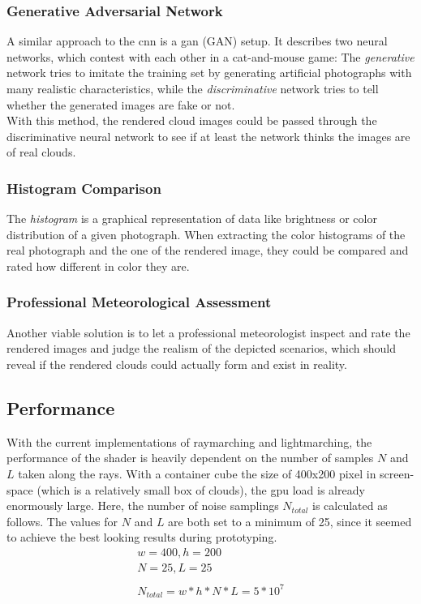 \subsubsection{Generative Adversarial Network}
A similar approach to the \gls{cnn} is a  \gls{gan} (GAN) setup. It describes two neural networks, which contest with each other in a cat-and-mouse game: The \textit{generative} network tries to imitate the training set by generating artificial photographs with many realistic characteristics, while the \textit{discriminative} network tries to tell whether the generated images are fake or not.
\\
With this method, the rendered cloud images could be passed through the discriminative neural network to see if at least the network thinks the images are of real clouds.

\subsubsection{Histogram Comparison}
The \textit{\gls{histogram}} is a graphical representation of data like brightness or color distribution of a given photograph.
When extracting the color \gls{histogram}s of the real photograph and the one of the rendered image, they could be compared and rated how different in color they are.

\subsubsection{Professional Meteorological Assessment}
Another viable solution is to let a professional meteorologist inspect and rate the rendered images and judge the realism of the depicted scenarios, which should reveal if the rendered clouds could actually form and exist in reality.

\clearpage
\subsection{Performance}
With the current implementations of \gls{raymarching} and \gls{lightmarching}, the performance of the shader is heavily dependent on the number of samples $N$ and $L$ taken along the rays.
With a container cube the size of 400x200 pixel in screen-space (which is a relatively small box of clouds), the \gls{gpu} load is already enormously large. 
Here, the number of noise samplings $N_{total}$ is calculated as follows. The values for $N$ and $L$ are both set to a minimum of 25, since it seemed to achieve the best looking results during prototyping.
$$ 
\begin{array}{l}
    w = 400, h = 200\\
    N = 25, L = 25\\ \\
    N_{total} = w * h * N * L = 5 * 10^7
\end{array}
$$

